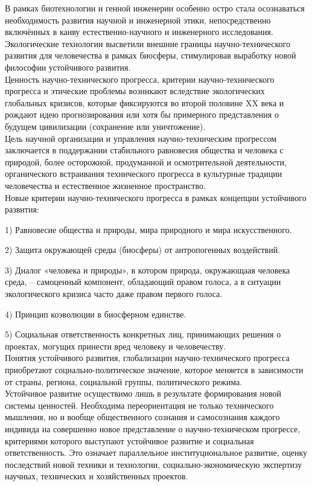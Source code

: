 \documentclass[exam_answers.tex]{subfiles}
\begin{document}
\renewcommand{\baselinestretch}{0.75}

В рамках биотехнологии и генной инженерии особенно остро стала осознаваться необходимость развития научной и инженерной этики, непосредственно включённых в канву естественно-научного и инженерного исследования.
Экологические технологии высветили внешние границы научно-технического развития для человечества в рамках биосферы, стимулировав выработку новой философии устойчивого развития.
\\

Ценность научно-технического прогресса, критерии научно-технического прогресса и этические проблемы возникают вследствие экологических глобальных кризисов, которые фиксируются во второй половине XX века и рождают идею прогнозирования или хотя бы примерного представления о будущем цивилизации (сохранение или уничтожение).
\\

Цель научной организации и управления научно-техническим прогрессом заключается в поддержании стабильного равновесия общества и человека с природой, более осторожной, продуманной и осмотрительной деятельности, органического встраивания технического прогресса в культурные традиции человечества и естественное жизненное пространство.
\\

Новые критерии научно-технического прогресса в рамках концепции устойчивого развития:

1) Равновесие общества и природы, мира природного и мира искусственного.

2) Защита окружающей среды (биосферы) от антропогенных воздействий.

3) Диалог «человека и природы», в котором природа, окружающаая человека среда, -- самоценный компонент, обладающий правом голоса, а в ситуации экологического кризиса часто даже правом первого голоса.

4) Принцип коэволюции в биосферном единстве.

5) Социальная ответственность конкретных лиц, принимающих решения о проектах, могущих принести вред человеку и человечеству.
\\

Понятия устойчивого развития, глобализации научно-технического прогресса приобретают социально-политическое значение, которое меняется в зависимости от страны, региона, социальной группы, политического режима.
\\

Устойчивое развитие осуществимо лишь в результате формирования новой системы ценностей.
Необходима переориентация не только технического мышления, но и вообще общественного сознания и самосознания каждого индивида на совершенно новое представление о научно-техническом прогрессе, критериями которого выступают устойчивое развитие и социальная ответственность.
Это означает параллельное институциональное развитие, оценку последствий новой техники и технологии, социально-экономическую экспертизу научных, технических и хозяйственных проектов.
\end{document}
